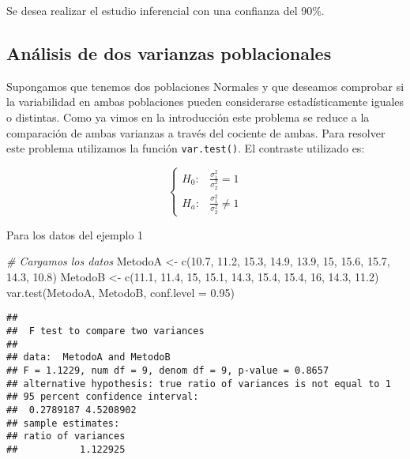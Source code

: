 \documentclass[
]{book}
\newenvironment{Shaded}{\begin{snugshade}}{\end{snugshade}}
\newcommand{\AttributeTok}[1]{\textcolor[rgb]{0.77,0.63,0.00}{#1}}
\newcommand{\CommentTok}[1]{\textcolor[rgb]{0.56,0.35,0.01}{\textit{#1}}}
\newcommand{\DecValTok}[1]{\textcolor[rgb]{0.00,0.00,0.81}{#1}}
\newcommand{\FloatTok}[1]{\textcolor[rgb]{0.00,0.00,0.81}{#1}}
\newcommand{\FunctionTok}[1]{\textcolor[rgb]{0.00,0.00,0.00}{#1}}
\newcommand{\NormalTok}[1]{#1}
\newcommand{\OtherTok}[1]{\textcolor[rgb]{0.56,0.35,0.01}{#1}}
\begin{document}
Se desea realizar el estudio inferencial con una confianza del 90\%.

\hypertarget{anuxe1lisis-de-dos-varianzas-poblacionales}{%
\subsection{Análisis de dos varianzas poblacionales}\label{anuxe1lisis-de-dos-varianzas-poblacionales}}

Supongamos que tenemos dos poblaciones Normales y que deseamos comprobar si la variabilidad en ambas poblaciones pueden considerarse estadísticamente iguales o distintas. Como ya vimos en la introducción este problema se reduce a la comparación de ambas varianzas a través del cociente de ambas. Para resolver este problema utilizamos la función \texttt{var.test()}. El contraste utilizado es:

\[\left\{\begin{array}{ll} H_0: & \frac{\sigma^2_1}{\sigma^2_2} = 1\\ H_a: & \frac{\sigma^2_1}{\sigma^2_2} \neq 1 \end{array}\right.\]

Para los datos del ejemplo 1

\begin{Shaded}
\begin{Highlighting}[]
\CommentTok{\# Cargamos los datos}
\NormalTok{MetodoA }\OtherTok{\textless{}{-}} \FunctionTok{c}\NormalTok{(}\FloatTok{10.7}\NormalTok{, }\FloatTok{11.2}\NormalTok{, }\FloatTok{15.3}\NormalTok{, }\FloatTok{14.9}\NormalTok{, }\FloatTok{13.9}\NormalTok{, }\DecValTok{15}\NormalTok{, }\FloatTok{15.6}\NormalTok{, }\FloatTok{15.7}\NormalTok{, }\FloatTok{14.3}\NormalTok{, }\FloatTok{10.8}\NormalTok{)}
\NormalTok{MetodoB }\OtherTok{\textless{}{-}} \FunctionTok{c}\NormalTok{(}\FloatTok{11.1}\NormalTok{, }\FloatTok{11.4}\NormalTok{, }\DecValTok{15}\NormalTok{, }\FloatTok{15.1}\NormalTok{, }\FloatTok{14.3}\NormalTok{, }\FloatTok{15.4}\NormalTok{, }\FloatTok{15.4}\NormalTok{, }\DecValTok{16}\NormalTok{, }\FloatTok{14.3}\NormalTok{, }\FloatTok{11.2}\NormalTok{)}
\FunctionTok{var.test}\NormalTok{(MetodoA, MetodoB, }\AttributeTok{conf.level =} \FloatTok{0.95}\NormalTok{)}
\end{Highlighting}
\end{Shaded}

\begin{verbatim}
## 
##  F test to compare two variances
## 
## data:  MetodoA and MetodoB
## F = 1.1229, num df = 9, denom df = 9, p-value = 0.8657
## alternative hypothesis: true ratio of variances is not equal to 1
## 95 percent confidence interval:
##  0.2789187 4.5208902
## sample estimates:
## ratio of variances 
##           1.122925
\end{verbatim}
\end{document}
